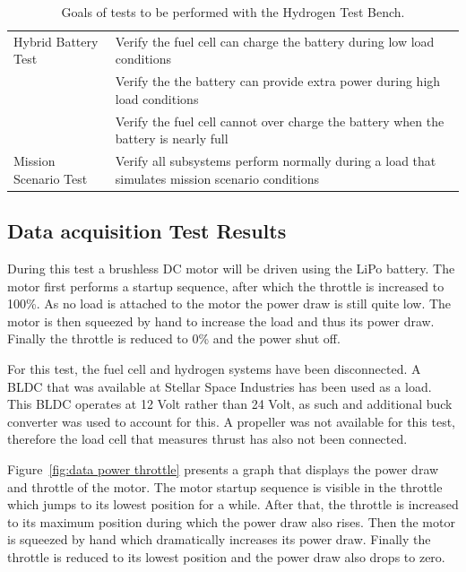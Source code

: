 \begin{table}[htp]
\begin{tabularx}{\textwidth}{lX}
        \midrule
        Hybrid Battery Test
                      & Verify the fuel cell can charge the battery during low load conditions                          \\
                      & Verify the the battery can provide extra power during high load conditions                      \\
                      & Verify the fuel cell cannot over charge the battery when the battery is nearly full             \\

        \midrule
        Mission Scenario Test
                      & Verify all subsystems perform normally during a load that simulates mission scenario conditions \\

        \bottomrule
    \end{tabularx}%
    \caption{Goals of tests to be performed with the Hydrogen Test Bench.}%
    \label{tab:h2 test goals}%
\end{table}

\subsection*{Data acquisition Test Results}
During this test a brushless DC motor will be driven using the LiPo battery. The motor first performs a startup sequence, after which the throttle is increased to 100\%. As no load is attached to the motor the power draw is still quite low. The motor is then squeezed by hand to increase the load and thus its power draw. Finally the throttle is reduced to 0\% and the power shut off.

For this test, the fuel cell and hydrogen systems have been disconnected. A BLDC that was available at Stellar Space Industries has been used as a load. This BLDC operates at 12 Volt rather than 24 Volt, as such and additional buck converter was used to account for this. A propeller was not available for this test, therefore the load cell that measures thrust has also not been connected.

Figure~\ref{fig:data power throttle} presents a graph that displays the power draw and throttle of the motor. The motor startup sequence is visible in the throttle which jumps to its lowest position for a while. After that, the throttle is increased to its maximum position during which the power draw also rises. Then the motor is squeezed by hand which dramatically increases its power draw. Finally the throttle is reduced to its lowest position and the power draw also drops to zero.

